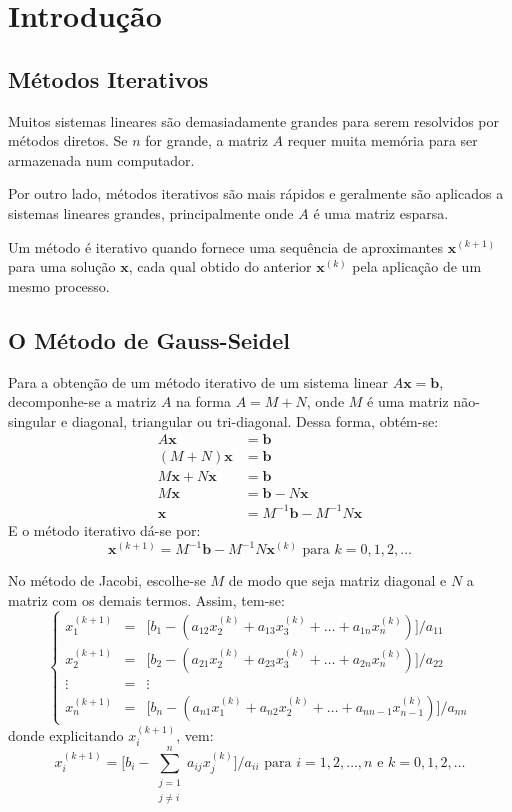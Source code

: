 \section{Introdução}

\subsection{Métodos Iterativos}

Muitos sistemas lineares são demasiadamente grandes para serem resolvidos por métodos diretos. Se $n$ for grande, a matriz $A$ requer muita memória para ser armazenada num computador.

Por outro lado, métodos iterativos são mais rápidos e geralmente são aplicados a sistemas lineares grandes, principalmente onde $A$ é uma matriz esparsa.

Um método é iterativo quando fornece uma sequência de aproximantes $\mathbf{x}^{(k+1)}$ para uma solução $\mathbf{x}$, cada qual obtido do anterior $\mathbf{x}^{(k)}$ pela aplicação de um mesmo processo.

\subsection{O Método de Gauss-Seidel}

Para a obtenção de um método iterativo de um sistema linear $A\mathbf{x} = \mathbf{b}$, decomponhe-se a matriz $A$ na forma $A = M + N$, onde $M$ é uma matriz não-singular e diagonal, triangular ou tri-diagonal. Dessa forma, obtém-se:
\begin{align*}
	A\mathbf{x}  & = \mathbf{b} \\
	(M + N)\mathbf{x}  & = \mathbf{b} \\
	M\mathbf{x} + N\mathbf{x}  & = \mathbf{b} \\
	M\mathbf{x} & = \mathbf{b} - N\mathbf{x} \\
	\mathbf{x} & = M^{-1}\mathbf{b} - M^{-1}N\mathbf{x}
\end{align*}
E o método iterativo dá-se por:
\[
	\mathbf{x}^{(k+1)} =M^{-1}\mathbf{b} - M^{-1}N\mathbf{x}^{(k)} \text{ para } k = 0, 1, 2, \dots
\]

No método de Jacobi, escolhe-se $M$ de modo que seja matriz diagonal e $N$ a matriz com os demais termos. Assim, tem-se:
\[
	\left \{
		\begin{array}{llll}
			x_{1}^{(k+1)} & = & \big[b_{1} - (a_{12}x_{2}^{(k)} + a_{13}x_{3}^{(k)} + \dots + a_{1n}x_{n}^{(k)}) \big] / a_{11}\\
			x_{2}^{(k+1)} & = & \big[b_{2} - (a_{21}x_{2}^{(k)} + a_{23}x_{3}^{(k)} + \dots + a_{2n}x_{n}^{(k)}) \big] / a_{22}\\
			\vdots       & = & \vdots \\
			x_{n}^{(k+1)} & = & \big[b_{n} - (a_{n1}x_{1}^{(k)} + a_{n2}x_{2}^{(k)} + \dots + a_{nn-1}x_{n-1}^{(k)}) \big] / a_{nn}
		\end{array}
	\right .
\]
donde explicitando $x_{i}^{(k+1)}$, vem:
\[
	x_{i}^{(k+1)} = \Big[b_{i} - \sum_{\substack{j = 1 \\ j \neq i}}^{n}a_{ij}x_{j}^{(k)} \Big] / a_{ii} \text{ para } i = 1, 2, \dots, n \text{ e } k = 0, 1, 2, \dots
\]

